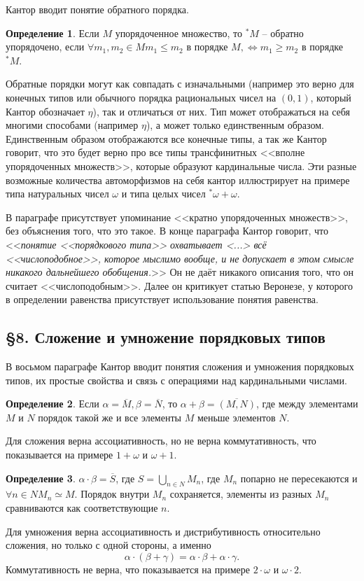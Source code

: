 \documentclass[a4paper,12pt]{extarticle}
\theoremstyle{definition}
\newtheorem{definition}{Определение}
\newcommand{\cit}[1]{<<\textit{#1}>>}
\begin{document}
Кантор вводит понятие обратного порядка.
\begin{definition}
    Если $M$ упорядоченное множество, то $^*M$ -- обратно упорядочено, если $\forall m_1, m_2 \in M m_1 \leqslant m_2$ в порядке $M, \iff m_1 \geqslant m_2$ в порядке $^*M$.
\end{definition}
Обратные порядки могут как совпадать с изначальными (например это верно для конечных типов или обычного порядка рациональных чисел на $(0, 1)$,
который Кантор обозначает $\eta$), так и отличаться от них.
Тип может отображаться на себя многими способами (например $\eta$), а может только единственным образом.
Единственным образом отображаются все конечные типы, а так же Кантор говорит, что это будет верно про все типы трансфинитных <<вполне упорядоченных множеств>>, которые образуют кардинальные числа.
Эти разные возможные количества автоморфизмов на себя кантор иллюстрирует на примере типа натуральных чисел $\omega$ и типа целых чисел $^*\omega + \omega$.

В параграфе присутствует упоминание <<кратно упорядоченных множеств>>, без объяснения того, что это такое.
В конце параграфа Кантор говорит, что \cit{понятие <<порядкового типа>> охватывает <...> всё <<числоподобное>>, которое мыслимо вообще, и не допускает в этом смысле никакого дальнейшего обобщения.}
Он не даёт никакого описания того, что он считает <<числоподобным>>.
Далее он критикует статью Веронезе, у которого в определении равенства присутствует использование понятия равенства.

\subsection{\S 8. Сложение и умножение порядковых типов}
В восьмом параграфе Кантор вводит понятия сложения и умножения порядковых типов, их простые свойства и связь с операциями над кардинальными числами.

\begin{definition}
    Если $\alpha = \overline{M}, \beta = \overline{N}$, то $\alpha + \beta = \overline{(M, N)}$, где между элементами $M$ и $N$ порядок такой же и все элементы $M$ меньше элементов $N$.
\end{definition}
Для сложения верна ассоциативность, но не верна коммутативность, что показывается на примере $1 + \omega$ и $\omega + 1$.
\begin{definition}
    $\alpha \cdot \beta = \overline{S}$, где $S = \bigcup\limits_{n \in N}M_n$, где $M_n$ попарно не пересекаются и $\forall n \in N M_n \simeq M$.
    Порядок внутри $M_n$ сохраняется, элементы из разных $M_n$ сравниваются как соответствующие $n$.
\end{definition}
Для умножения верна ассоциативность и дистрибутивность относительно сложения, но только с одной стороны, а именно $$\alpha \cdot (\beta + \gamma) = \alpha \cdot \beta + \alpha \cdot \gamma.$$
Коммутативность не верна, что показывается на примере $2 \cdot \omega$ и $\omega \cdot 2$.
\end{document}
